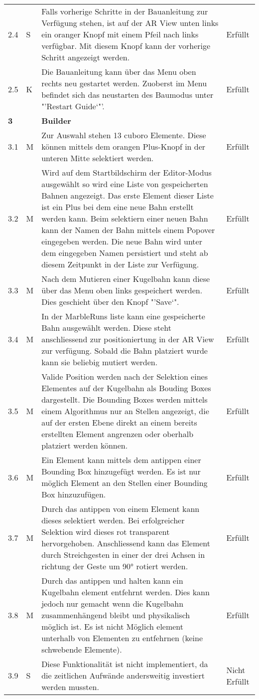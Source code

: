 \begin{longtable}{l l p{10cm} l}
	2.4 & S & Falls vorherige Schritte in der Bauanleitung zur Verfügung stehen, ist auf der AR View unten links ein oranger Knopf mit einem Pfeil nach links verfügbar. Mit diesem Knopf kann der vorherige Schritt angezeigt werden. & Erfüllt \\
	2.5 & K & Die Bauanleitung kann über das Menu oben rechts neu gestartet werden. Zuoberst im Menu befindet sich das neustarten des Baumodus unter "'Restart Guide`"'. & Erfüllt \\
	\hline
	\textbf{3} & & \textbf{Builder} & \\
	\hline
	3.1 & M & Zur Auswahl stehen 13 cuboro Elemente. Diese können mittels dem orangen Plus-Knopf in der unteren Mitte selektiert werden. & Erfüllt \\
	3.2 & M & Wird auf dem Startbildschirm der Editor-Modus ausgewählt so wird eine Liste von gespeicherten Bahnen angezeigt. Das erste Element dieser Liste ist ein Plus bei dem eine neue Bahn erstellt werden kann. Beim selektiern einer neuen Bahn kann der Namen der Bahn mittels einem Popover eingegeben werden. Die neue Bahn wird unter dem eingegeben Namen persistiert und steht ab diesem Zeitpunkt in der Liste zur Verfügung. & Erfüllt \\
	3.3 & M & Nach dem Mutieren einer Kugelbahn kann diese über das Menu oben links gespeichert werden. Dies geschieht über den Knopf "'Save`". & Erfüllt \\
	3.4 & M & In der MarbleRuns liste kann eine gespeicherte Bahn ausgewählt werden. Diese steht anschliessend zur positioniertung in der AR View zur verfügung. Sobald die Bahn platziert wurde kann sie beliebig mutiert werden. & Erfüllt \\
	3.5 & M & Valide Position werden nach der Selektion eines Elementes auf der Kugelbahn als Bouding Boxes dargestellt. Die Bounding Boxes werden mittels einem Algorithmus nur an Stellen angezeigt, die auf der ersten Ebene direkt an einem bereits erstellten Element angrenzen oder oberhalb platziert werden können. & Erfüllt \\
	3.6 & M & Ein Element kann mittels dem antippen einer Bounding Box hinzugefügt werden. Es ist nur möglich Element an den Stellen einer Bounding Box hinzuzufügen. & Erfüllt \\
	3.7 & M & Durch das antippen von einem Element kann dieses selektiert werden. Bei erfolgreicher Selektion wird dieses rot transparent hervorgehoben. Anschliessend kann das Element durch Streichgesten in einer der drei Achsen in richtung der Geste um 90° rotiert werden. & Erfüllt \\
	3.8 & M & Durch das antippen und halten kann ein Kugelbahn element entfehrnt werden. Dies kann jedoch nur gemacht wenn die Kugelbahn zusammenhängend bleibt und physikalisch möglich ist. Es ist nicht Möglich element unterhalb von Elementen zu entfehrnen (keine schwebende Elemente). & Erfüllt \\
	3.9 & S & Diese Funktionalität ist nicht implementiert, da die zeitlichen Aufwände andersweitig investiert werden mussten. & Nicht Erfüllt \\
\end{longtable}